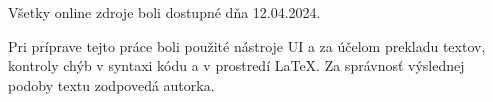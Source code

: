 \documentclass[12pt, twoside]{book}
\theoremstyle{definition}
\begin{document}
\begin{thebibliography}{99}
Všetky online zdroje boli dostupné dňa 12.04.2024.

\vspace{\baselineskip}

Pri príprave tejto práce boli použité nástroje UI \cite{Deepl} a \cite{ChatGPT} za účelom prekladu textov, kontroly chýb v syntaxi kódu a v prostredí \LaTeX. Za správnosť výslednej podoby textu zodpovedá autorka.






\end{thebibliography}




\newpage

%
%
\end{document}

